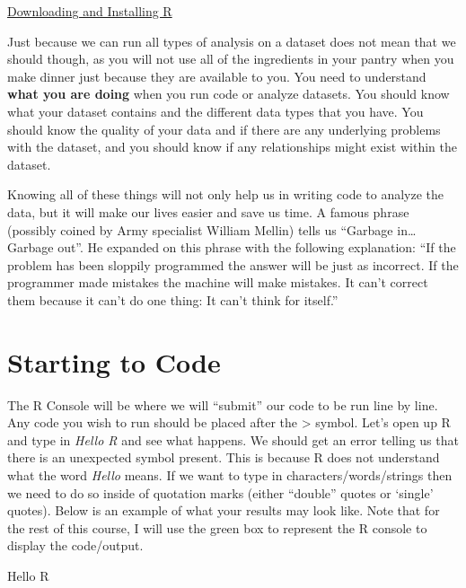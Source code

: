 \documentclass[
  letterpaper,
  DIV=11,
  numbers=noendperiod]{scrreprt}
\newenvironment{Shaded}{\begin{snugshade}}{\end{snugshade}}
\newcommand{\NormalTok}[1]{\textcolor[rgb]{0.00,0.23,0.31}{#1}}
\begin{document}
\begin{watch}{}{}
    \href{https://youtu.be/TP9KX50x6a0}{Downloading and Installing R}
\end{watch}

Just because we can run all types of analysis on a dataset does not mean
that we should though, as you will not use all of the ingredients in
your pantry when you make dinner just because they are available to you.
You need to understand \textbf{what you are doing} when you run code or
analyze datasets. You should know what your dataset contains and the
different data types that you have. You should know the quality of your
data and if there are any underlying problems with the dataset, and you
should know if any relationships might exist within the dataset.

Knowing all of these things will not only help us in writing code to
analyze the data, but it will make our lives easier and save us time. A
famous phrase (possibly coined by Army specialist William Mellin) tells
us ``Garbage in\ldots{} Garbage out''. He expanded on this phrase with
the following explanation: ``If the problem has been sloppily programmed
the answer will be just as incorrect. If the programmer made mistakes
the machine will make mistakes. It can't correct them because it can't
do one thing: It can't think for itself.''

\section{Starting to Code}\label{starting-to-code}

The R Console will be where we will ``submit'' our code to be run line
by line. Any code you wish to run should be placed after the
\textgreater{} symbol. Let's open up R and type in \emph{Hello R} and
see what happens. We should get an error telling us that there is an
unexpected symbol present. This is because R does not understand what
the word \emph{Hello} means. If we want to type in
characters/words/strings then we need to do so inside of quotation marks
(either ``double'' quotes or `single' quotes). Below is an example of
what your results may look like. Note that for the rest of this course,
I will use the green box to represent the R console to display the
code/output.

\begin{Shaded}
\begin{Highlighting}[]
\NormalTok{Hello R}
\end{Highlighting}
\end{Shaded}
\end{document}

